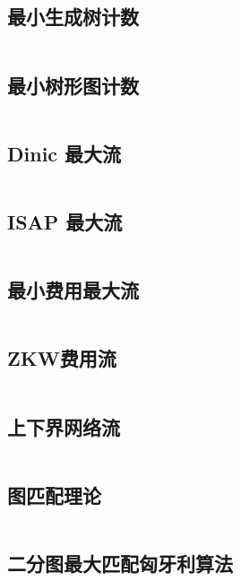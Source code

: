 \inputminted{cpp}{code/SMST_Kruskal.cc}

\subsection{最小生成树计数} 

\inputminted{cpp}{code/determinant.cc}

\subsection{最小树形图计数} 

\inputminted{cpp}{code/zhuliucount.cc}

\subsection{Dinic 最大流} 

\inputminted{cpp}{code/Dinic.cc}

\subsection{ISAP 最大流} 

\inputminted{cpp}{code/ISAP.cc}

\subsection{最小费用最大流} 

\inputminted{cpp}{code/mincost_maxflow.cc}

\subsection{ZKW费用流} 

\inputminted{cpp}{code/zkwCostFlow.cc}

\subsection{上下界网络流} 

\inputminted{cpp}{code/upperlowerFlow.cc}

\subsection{图匹配理论} 

\inputminted{text}{code/Binarymatching.txt}

\subsection{二分图最大匹配匈牙利算法} 


